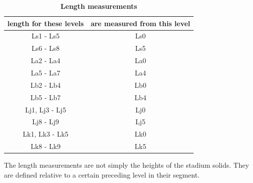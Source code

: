 \documentclass[10pt]{article}
\begin{document}
\begin{table}[!ht]
  \centering
  \caption{
    \bf{Length measurements}
  }
  \begin{tabular}{cc}
    \hline
    \textbf{length for these levels} & \textbf{are measured from this level}\\
    \hline
    Ls1 - Ls5 & Ls0 \\
    Ls6 - Ls8 & Ls5 \\
    La2 - La4 & La0 \\
    La5 - La7 & La4 \\
    Lb2 - Lb4 & Lb0 \\
    Lb5 - Lb7 & Lb4 \\
    Lj1, Lj3 - Lj5 & Lj0 \\
    Lj8 - Lj9 & Lj5  \\
    Lk1, Lk3 - Lk5 & Lk0 \\
    Lk8 - Lk9 & Lk5  \\
  \end{tabular}
  \begin{flushleft}
    The length measurements are not simply the heights of the stadium solids.
    They are defined relative to a certain preceding level in their segment.
  \end{flushleft}
  \label{tab:length}
\end{table}
\end{document}
